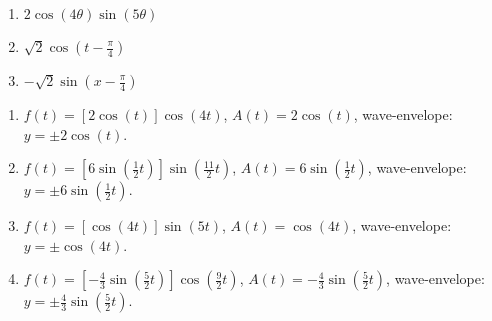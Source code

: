 \begin{multicols}{3}

\begin{enumerate}

\setcounter{enumi}{\value{HW}}

\item $2\cos(4\theta)\sin(5\theta)$
\item $\sqrt{2}\cos \left(t - \frac{\pi}{4} \right)$
\item $-\sqrt{2}\sin \left(x - \frac{\pi}{4} \right)$

\setcounter{HW}{\value{enumi}}

\end{enumerate}

\end{multicols}


\begin{enumerate}

\setcounter{enumi}{\value{HW}}

\item $f(t) = [2\cos(t)] \cos(4t)$, $A(t) = 2\cos(t)$, wave-envelope:  $y = \pm 2\cos(t)$.
\item $f(t) = \left[6\sin \left( \frac{1}{2} t \right) \right] \sin \left( \frac{11}{2} t \right) $, $A(t) = 6\sin \left( \frac{1}{2} t \right) $, wave-envelope:  $y = \pm  6\sin \left( \frac{1}{2} t \right)$.
\item $f(t) = [\cos(4t)] \sin(5t)$, $A(t) = \cos(4t)$, wave-envelope:  $y = \pm \cos(4t)$.
\item $f(t) =  \left[-\frac{4}{3}\sin \left( \frac{5}{2} t \right) \right]\cos \left( \frac{9}{2} t \right) $, $A(t) = -\frac{4}{3}\sin \left( \frac{5}{2} t \right)$, wave-envelope:  $y = \pm \frac{4}{3} \sin \left( \frac{5}{2} t \right)$.

\setcounter{HW}{\value{enumi}}

\end{enumerate}





